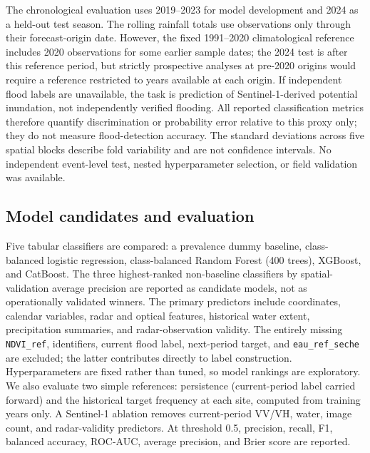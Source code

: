 \documentclass[pdflatex,sn-mathphys,Numbered]{sn-jnl}
\begin{document}
The chronological evaluation uses 2019--2023 for model development and 2024 as a held-out test season. The rolling rainfall totals use observations only through their forecast-origin date. However, the fixed 1991--2020 climatological reference includes 2020 observations for some earlier sample dates; the 2024 test is after this reference period, but strictly prospective analyses at pre-2020 origins would require a reference restricted to years available at each origin. If independent flood labels are unavailable, the task is prediction of Sentinel-1-derived potential inundation, not independently verified flooding. All reported classification metrics therefore quantify discrimination or probability error relative to this proxy only; they do not measure flood-detection accuracy. The standard deviations across five spatial blocks describe fold variability and are not confidence intervals. No independent event-level test, nested hyperparameter selection, or field validation was available.

\subsection{Model candidates and evaluation}
Five tabular classifiers are compared: a prevalence dummy baseline, class-balanced logistic regression, class-balanced Random Forest (400 trees), XGBoost, and CatBoost. The three highest-ranked non-baseline classifiers by spatial-validation average precision are reported as candidate models, not as operationally validated winners. The primary predictors include coordinates, calendar variables, radar and optical features, historical water extent, precipitation summaries, and radar-observation validity. The entirely missing \texttt{NDVI\_ref}, identifiers, current flood label, next-period target, and \texttt{eau\_ref\_seche} are excluded; the latter contributes directly to label construction. Hyperparameters are fixed rather than tuned, so model rankings are exploratory. We also evaluate two simple references: persistence (current-period label carried forward) and the historical target frequency at each site, computed from training years only. A Sentinel-1 ablation removes current-period VV/VH, water, image count, and radar-validity predictors. At threshold 0.5, precision, recall, F1, balanced accuracy, ROC-AUC, average precision, and Brier score are reported.
\end{document}
